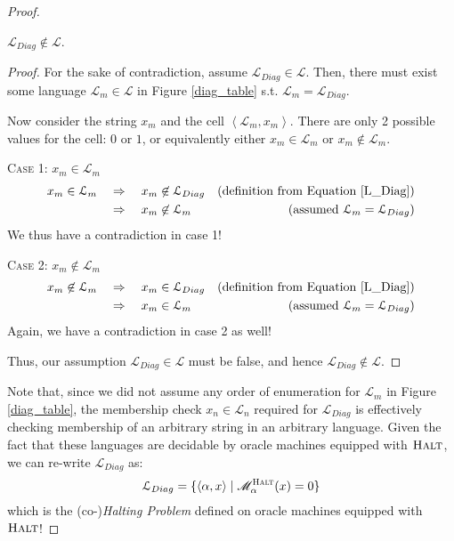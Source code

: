 \documentclass[usletter]{article}
\newcommand {\langset}[1]      {\ensuremath{\mathcal{#1}}}
\newcommand {\machine}[1]      {\ensuremath{\mathscr{#1}}}
\newcommand {\namedlangset}[1] {\ensuremath{\textnormal{\textsc{#1}}}}
\newcommand {\term}[1]      {\textit{#1}}
\newcommand {\langL}          {\langset{L}}
\newcommand {\machineM}       {\machine{M}}
\begin{document}
\begin{enumerate}[labelsep=2.5em, label=\textbf{\arabic{enumi}}]
\begin{proof}
    \begin{claim}
      $ \langL_{Diag} \not\in \langL $.
    \end{claim}
    \begin{proof}
      For the sake of contradiction, assume $\langL_{Diag} \in \langL$. Then,
      there must exist some language $\langL_m \in \langL$ in Figure
      \ref{diag_table} s.t. $\langL_m = \langL_{Diag}$.

      Now consider the string $x_m$ and the cell $\left< \langL_m, x_m \right>$.
      There are only 2 possible values for the cell: $0$ or $1$, or equivalently
      either $x_m \in \langL_m$ or $x_m \not\in \langL_m$.

      \textsc{Case 1: $x_m \in \langL_m$}
      \begin{align*}
        x_m \in \langL_m \quad &\Rightarrow \quad x_m \not\in \langL_{Diag}
            & (\textnormal{definition from Equation }\ref{L_Diag})\\
          &\Rightarrow \quad x_m \not\in \langL_m
            & (\textnormal{assumed }\langL_m = \langL_{Diag})
      \end{align*}
      We thus have a contradiction in case 1!

      \textsc{Case 2: $x_m \not\in \langL_m$}
      \begin{align*}
        x_m \not\in \langL_m \quad &\Rightarrow \quad x_m \in \langL_{Diag}
            & (\textnormal{definition from Equation }\ref{L_Diag})\\
          &\Rightarrow \quad x_m \in \langL_m
            & (\textnormal{assumed }\langL_m = \langL_{Diag})
      \end{align*}
      Again, we have a contradiction in case 2 as well!

      Thus, our assumption  $\langL_{Diag} \in \langL$ must be false, and hence
      $\langL_{Diag} \not\in \langL$.
    \end{proof}

    Note that, since we did not assume any order of enumeration for $\langL_m$
    in Figure \ref{diag_table}, the membership check $x_n \in \langL_n$ required
    for $\langL_{Diag}$ is effectively checking membership of an arbitrary
    string in an arbitrary language. Given the fact that these languages are
    decidable by oracle machines equipped with \namedlangset{Halt}, we can
    re-write $\langL_{Diag}$ as:
    $$
      \langL_{Diag} = \{ \left< \alpha , x \right> \mid
                         \machineM_\alpha^\namedlangset{Halt}(x) = 0 \}
    $$
    which is the (co-)\term{Halting Problem} defined on oracle machines equipped
    with \namedlangset{Halt}!
  \end{proof}


\end{enumerate}
\end{document}

